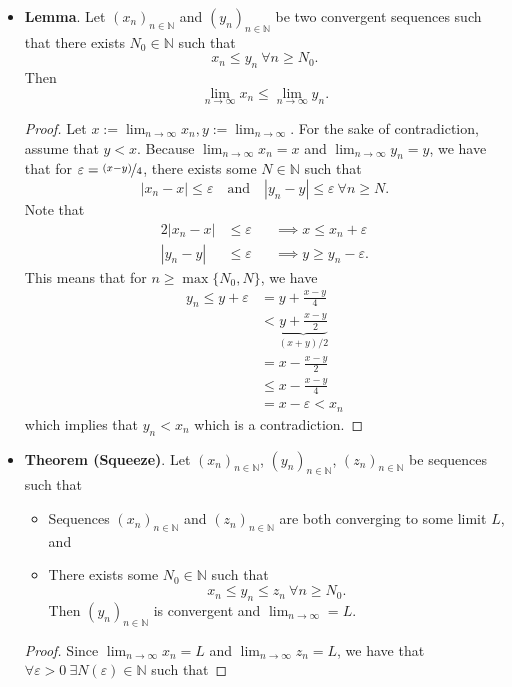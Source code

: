 \documentclass{article}
\newcommand{\N}{\mathbb{N}}
\newcommand{\seq}[2]{(#1_{#2})_{#2 \in \N}}
\newcommand{\mylim}[2]{\lim_{#1 \to #2}}
\newcommand{\?}{\stackrel{?}{=}}
\newcommand{\smallblacksquare}{\rule{0.5em}{0.5em}}
\begin{document}
\begin{itemize}
    \item \textbf{Lemma}. Let $\seq{x}{n}$ and $\seq{y}{n}$ be two convergent sequences such that there exists $N_0 \in \N$ such that
    $$x_n \leq y_n \ \forall n \geq N_0.$$
    Then
    $$\lim\limits_{n \to \infty} x_n \leq \lim\limits_{n \to \infty} y_n.$$
    \begin{proof}
        Let $x := \mylim{n}{\infty} x_n, y := \mylim{n}{\infty}$. For the sake of contradiction, assume that $y < x$. Because $\mylim{n}{\infty} x_n = x$ and $\mylim{n}{\infty} y_n = y$, we have that for $\varepsilon = \nicefrac{(x - y)}{4}$, there exists some $N \in \N$ such that
        $$|x_n - x| \leq \varepsilon \quad \text{and} \quad |y_n - y| \leq \varepsilon \ \forall n \geq N.$$
        Note that
        \begin{alignat*}{2}
            |x_n - x| &\leq \varepsilon &&\implies x \leq x_n + \varepsilon \\
            |y_n - y| &\leq\varepsilon && \implies y \geq y_n - \varepsilon.
        \end{alignat*}
        This means that for $n \geq \max\{N_0, N\}$, we have
        \begin{align*}
            y_n \leq y + \varepsilon &= y + \frac{x - y}{4} \\
            &< \underbrace{y + \frac{x - y}{2}}_{(x + y)/2} \\
            &= x - \frac{x - y}{2} \\
            &\leq x - \frac{x - y}{4} \\
            &= x - \varepsilon < x_n
        \end{align*}
        which implies that $y_n < x_n$ which is a contradiction.
    \end{proof}
    \item \textbf{Theorem (Squeeze)}. Let $\seq{x}{n}$, $\seq{y}{n}$, $\seq{z}{n}$ be sequences such that
    \begin{itemize}[label=\smallblacksquare]
        \item Sequences $\seq{x}{n}$ and $\seq{z}{n}$ are both converging to some limit $L$, and
        \item There exists some $N_0 \in \N$ such that
        $$x_n \leq y_n \leq z_n \ \forall n \geq N_0.$$
        Then $\seq{y}{n}$ is convergent and $\mylim{n}{\infty} = L$.
    \end{itemize}
        \begin{proof}
            Since $\mylim{n}{\infty} x_n = L$ and $\mylim{n}{\infty} z_n = L$, we have that $\forall \varepsilon > 0 \ \exists N(\varepsilon) \in \N$ such that

\end{proof}
\end{itemize}
\end{document}
